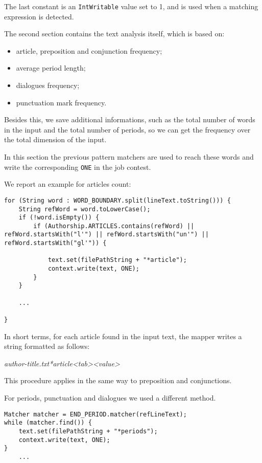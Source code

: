 \documentclass[a4paper,11pt, twoside]{article}
\begin{document}
	The last constant is an \lstinline|IntWritable| value set to 1, and is used when a matching expression is detected.

	The second section contains the text analysis itself, which is based on: \begin{itemize}
		\item article, preposition and conjunction frequency;
		\item average period length;
		\item dialogues frequency;
		\item punctuation mark frequency.
	\end{itemize}
	Besides this, we save additional informations, such as the total number of words in the input and the total number of periods, so we can get the frequency over the total dimension of the input.

	In this section the previous pattern matchers are used to reach these words and write the corresponding \lstinline|ONE| in the job contest. 
	
	We report an example for articles count: \begin{lstlisting}[firstnumber=82, caption={Articles counting in Map method}, captionpos=b]
for (String word : WORD_BOUNDARY.split(lineText.toString())) {
	String refWord = word.toLowerCase();
	if (!word.isEmpty()) {
		if (Authorship.ARTICLES.contains(refWord) || refWord.startsWith("l'") || refWord.startsWith("un'") || refWord.startsWith("gl'")) {
		
			text.set(filePathString + "*article");
			context.write(text, ONE);
		}
	}

	...

}
	\end{lstlisting}
	
	In short terms, for each article found in the input text, the mapper writes a string formatted as follows:\begin{center}
		\textit{author-title.txt*article\textless tab\textgreater \textless value\textgreater} 
	\end{center}

	This procedure applies in the same way to preposition and conjunctions.
	
	\bigskip
	\noindent
	For periods, punctuation and dialogues we used a different method.
	\begin{lstlisting}[firstnumber=109, caption={Periods counting in Map method}, captionpos=b]
Matcher matcher = END_PERIOD.matcher(refLineText);
while (matcher.find()) {
	text.set(filePathString + "*periods");
	context.write(text, ONE);
}
	...
	\end{lstlisting}
	
\end{document}
